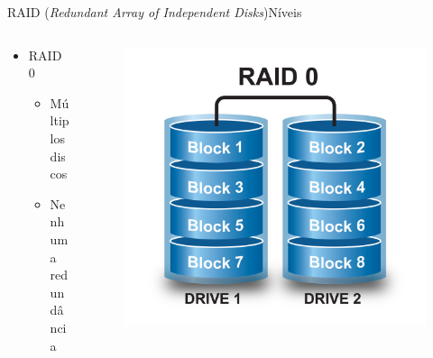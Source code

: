 \documentclass[aspectratio=169,
				xcolor=table]{beamer}
\begin{document}
	\begin{frame}[t]{RAID (\textit{Redundant Array of Independent Disks})}{Níveis}	
		\begin{columns}[t]
			\begin{column}{0.5\textwidth}
				\begin{itemize}
					\item RAID 0
					\begin{itemize}
						\item Múltiplos discos
						\item Nenhuma redundância
					\end{itemize}
				\end{itemize}				
			\end{column}
			\begin{column}{0.5\textwidth}							
				\begin{figure}
					\centering
					\vspace{-1em}
					\includegraphics[height=0.7\textheight, keepaspectratio]{../figs/cap08/raid0}
				\end{figure}
			\end{column}
		\end{columns}

		
	\end{frame}
	
\end{document}
